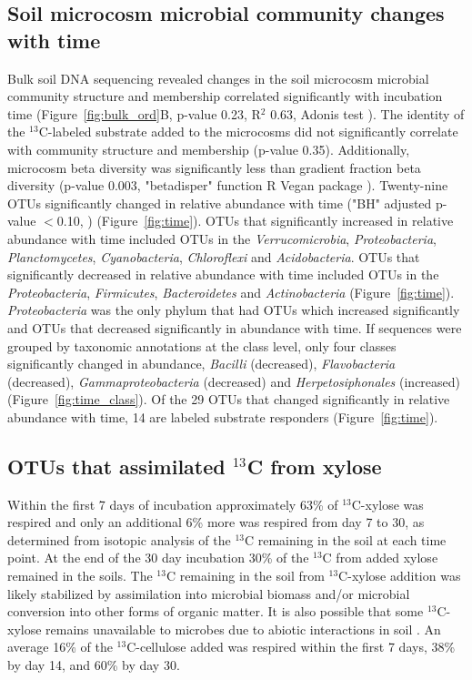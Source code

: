 \subsection{Soil microcosm microbial community changes with time}
Bulk soil DNA sequencing revealed changes in the soil microcosm microbial
community structure and membership correlated significantly with incubation
time (Figure~\ref{fig:bulk_ord}B, p-value 0.23, R$^{2}$ 0.63, Adonis test
\citet{Anderson2001a}). The identity of the $^{13}$C-labeled substrate added to
the microcosms did not significantly correlate with community structure and
membership (p-value 0.35). Additionally, microcosm beta diversity was
significantly less than gradient fraction beta diversity (p-value 0.003,
"betadisper" function R Vegan package \citet{Anderson2006,oksanen2007vegan}).
Twenty-nine OTUs significantly changed in relative abundance with time ("BH"
adjusted p-value $<$0.10, \citet{YBenjamini1995}) (Figure~\ref{fig:time}). OTUs
that significantly increased in relative abundance with time included OTUs in
the \textit{Verrucomicrobia}, \textit{Proteobacteria}, \textit{Planctomycetes},
\textit{Cyanobacteria}, \textit{Chloroflexi} and \textit{Acidobacteria}. OTUs
that significantly decreased in relative abundance with time included OTUs in
the \textit{Proteobacteria}, \textit{Firmicutes}, \textit{Bacteroidetes} and
\textit{Actinobacteria} (Figure~\ref{fig:time}). \textit{Proteobacteria} was
the only phylum that had OTUs which increased significantly and OTUs that
decreased significantly in abundance with time. If sequences were grouped by
taxonomic annotations at the class level, only four classes significantly
changed in abundance, \textit{Bacilli} (decreased), \textit{Flavobacteria}
(decreased), \textit{Gammaproteobacteria} (decreased) and
\textit{Herpetosiphonales} (increased) (Figure~\ref{fig:time_class}). Of the
29 OTUs that changed significantly in relative abundance with time, 14 are
labeled substrate responders (Figure~\ref{fig:time}).

\subsection{OTUs that assimilated $^{13}$C from xylose}
Within the first 7 days of incubation approximately 63\% of $^{13}$C-xylose was
respired and only an additional 6\% more was respired from day 7 to 30, as
determined from isotopic analysis of the $^{13}$C remaining in the soil at each
time point. At the end of the 30 day incubation 30\% of the $^{13}$C from added
xylose remained in the soils. The $^{13}$C remaining in the soil from
$^{13}$C-xylose addition was likely stabilized by assimilation into microbial
biomass and/or microbial conversion into other forms of organic matter. It is
also possible that some $^{13}$C-xylose remains unavailable to microbes due to
abiotic interactions in soil \citep{Kalbitz_2000}. An average 16\% of the
$^{13}$C-cellulose added was respired within the first 7 days, 38\% by day 14,
and 60\% by day 30.   

